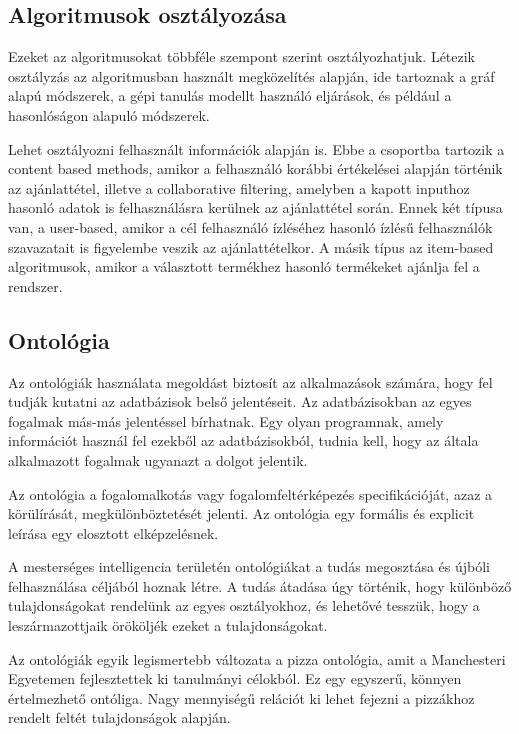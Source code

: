 \subsection{Algoritmusok osztályozása}

Ezeket az algoritmusokat többféle szempont szerint osztályozhatjuk. Létezik osztályzás az algoritmusban használt megközelítés alapján, ide tartoznak a gráf alapú módszerek, a gépi tanulás modellt használó eljárások, és például a hasonlóságon alapuló módszerek.

Lehet osztályozni felhasznált információk alapján is. Ebbe a csoportba tartozik a content based methods, amikor a felhasználó korábbi értékelései alapján történik az ajánlattétel, illetve a collaborative filtering, amelyben a kapott inputhoz hasonló adatok is felhasználásra kerülnek az ajánlattétel során. Ennek két típusa van, a user-based, amikor a cél felhasználó ízléséhez hasonló ízlésű felhasználók szavazatait is figyelembe veszik az ajánlattételkor. A másik típus az item-based algoritmusok, amikor a választott termékhez hasonló termékeket ajánlja fel a rendszer.

\subsection{Ontológia}

Az ontológiák használata megoldást biztosít az alkalmazások számára, hogy fel tudják kutatni az adatbázisok belső jelentéseit. Az adatbázisokban az egyes fogalmak más-más jelentéssel bírhatnak. Egy olyan programnak, amely információt használ fel ezekből az adatbázisokból, tudnia kell, hogy az általa alkalmazott fogalmak ugyanazt a dolgot jelentik.

Az ontológia a fogalomalkotás vagy fogalomfeltérképezés specifikációját, azaz a körülírását, megkülönböztetését jelenti. Az ontológia egy formális és explicit leírása egy elosztott elképzelésnek. 

A mesterséges intelligencia területén ontológiákat a tudás megosztása és újbóli felhasználása céljából hoznak létre. A tudás átadása úgy történik, hogy különböző tulajdonságokat rendelünk az egyes osztályokhoz, és lehetővé tesszük, hogy a leszármazottjaik örököljék ezeket a tulajdonságokat.

Az ontológiák egyik legismertebb változata a pizza ontológia, amit a Manchesteri Egyetemen fejlesztettek ki tanulmányi célokból. Ez egy egyszerű, könnyen értelmezhető ontóliga. Nagy mennyiségű relációt ki lehet fejezni a pizzákhoz rendelt feltét tulajdonságok alapján.


